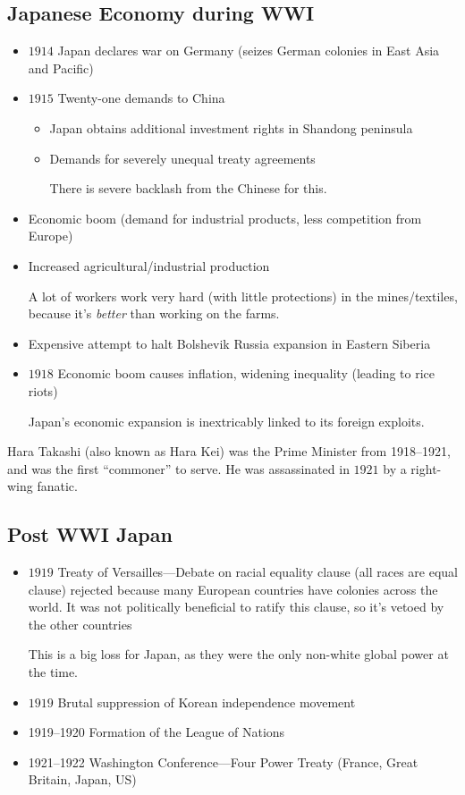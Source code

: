 \documentclass[class=article, crop=false]{standalone}
\begin{document}
  \subsection{Japanese Economy during WWI}
  \begin{itemize}
    \item $1914$ Japan declares war on Germany (seizes German colonies in East Asia and Pacific)
    \item $1915$ Twenty-one demands to China
    \begin{itemize}
      \item Japan obtains additional investment rights in Shandong peninsula
      \item Demands for severely unequal treaty agreements
      \begin{note}{}
        There is severe backlash from the Chinese for this.
      \end{note}
    \end{itemize}
    \item Economic boom (demand for industrial products, less competition from Europe)
    \item Increased agricultural/industrial production
    \begin{note}{}
      A lot of workers work very hard (with little protections) in the mines/textiles, because it's \emph{better} than working on the farms.
    \end{note}
    \item Expensive attempt to halt Bolshevik Russia expansion in Eastern Siberia
    \item $1918$ Economic boom causes inflation, widening inequality (leading to rice riots)
    \begin{note}{}
      Japan's economic expansion is inextricably linked to its foreign exploits.
    \end{note}
  \end{itemize}
  Hara Takashi (also known as Hara Kei) was the Prime Minister from 1918--1921, and was the first ``commoner'' to serve. He was assassinated in $1921$ by a right-wing fanatic.
  \subsection{Post WWI Japan}
  \begin{itemize}
    \item $1919$ Treaty of Versailles---Debate on racial equality clause (all races are equal clause) rejected because many European countries have colonies across the world. It was not politically beneficial to ratify this clause, so it's vetoed by the other countries
    \begin{note}{}
      This is a big loss for Japan, as they were the only non-white global power at the time.
    \end{note}
    \item $1919$ Brutal suppression of Korean independence movement
    \item 1919--1920 Formation of the League of Nations
    \item 1921--1922 Washington Conference---Four Power Treaty (France, Great Britain, Japan, US)
  \end{itemize}
\end{document}
